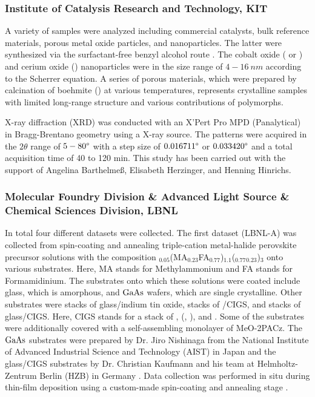 \subsubsection*{Institute of Catalysis Research and Technology, KIT}

A variety of samples were analyzed including commercial catalysts, bulk reference materials, porous metal oxide particles, and nanoparticles. The latter were synthesized via the surfactant-free benzyl alcohol route \cite{Wolf2019, Wolf2018}. The cobalt oxide ( or ) and cerium oxide () nanoparticles were in the size range of $4-16 \ \si{nm}$ according to the Scherrer equation. A series of porous  materials, which were prepared by calcination of boehmite () at various temperatures, represents crystalline samples with limited long-range structure and various contributions of  polymorphs.

X-ray diffraction (XRD) was conducted with an X’Pert Pro MPD (Panalytical) in Bragg-Brentano geometry using a  X-ray source. The patterns were acquired in the $2\theta$ range of $5-80\degree$ with a step size of $0.016711\degree$ or $0.033420\degree$ and a total acquisition time of 40 to 120 min. This study has been carried out with the support of Angelina Barthelmeß, Elisabeth Herzinger, and Henning Hinrichs.

\subsubsection*{Molecular Foundry Division \& Advanced Light Source \& Chemical Sciences Division, LBNL}

In total four different datasets were collected. The first dataset (LBNL-A) was collected from spin-coating and annealing triple-cation metal-halide perovskite precursor solutions with the composition $_{0.05}$(MA$_{0.23}$FA$_{0.77}$)$_{1.1}$($_{0.77}$$_{0.23}$)$_{3}$ onto various substrates. Here, MA stands for Methylammonium and FA stands for Formamidinium. The substrates onto which these solutions were coated include glass, which is amorphous, and $\ce{GaAs}$ wafers, which are single crystalline. Other substrates were stacks of glass/indium tin oxide, stacks of /CIGS, and stacks of glass/CIGS. Here, CIGS stands for a stack of , (, ), and . Some of the substrates were additionally covered with a self-assembling monolayer of MeO-2PACz. The $\ce{GaAs}$ substrates were prepared by Dr. Jiro Nishinaga from the National Institute of Advanced Industrial Science and Technology (AIST) in Japan \cite{nishinaga2018} and the glass/CIGS substrates by Dr. Christian Kaufmann and his team at Helmholtz-Zentrum Berlin (HZB) in Germany \cite{heinemann2017}. Data collection was performed in situ during thin-film deposition using a custom-made spin-coating and annealing stage \cite{song2019}. 

